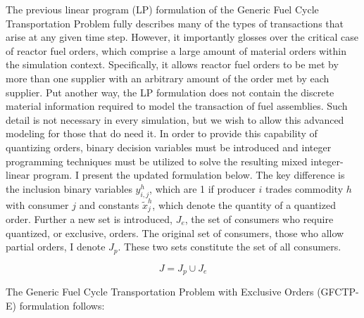 The previous linear program (LP) formulation of the Generic Fuel Cycle
Transportation Problem fully describes many of the types of transactions that
arise at any given time step. However, it importantly glosses over the critical
case of reactor fuel orders, which comprise a large amount of material orders
within the simulation context. Specifically, it allows reactor fuel orders to be
met by more than one supplier with an arbitrary amount of the order met by each
supplier. Put another way, the LP formulation does not contain the discrete
material information required to model the transaction of fuel assemblies. Such
detail is not necessary in every simulation, but we wish to allow this advanced
modeling for those that do need it. In order to provide this capability of
quantizing orders, binary decision variables must be introduced and integer
programming techniques must be utilized to solve the resulting mixed
integer-linear program. I present the updated formulation below. The key
difference is the inclusion binary variables $y_{i,j}^{h}$, which are 1 if
producer $i$ trades commodity $h$ with consumer $j$ and constants
$\tilde{x}_{j}^{h}$, which denote the quantity of a quantized order. Further a
new set is introduced, $J_{e}$, the set of consumers who require quantized, or
exclusive, orders. The original set of consumers, those who allow partial
orders, I denote $J_{p}$. These two sets constitute the set of all consumers.

\begin{equation}\label{eqs:consumer-union}
  J = J_{p} \cup J_{e}
\end{equation}

The Generic Fuel Cycle Transportation Problem with Exclusive Orders (GFCTP-E)
formulation follows:

